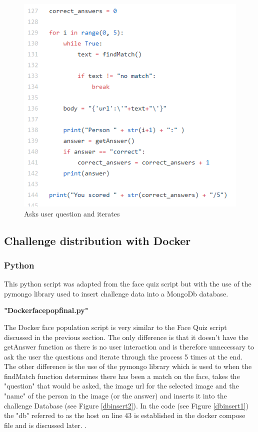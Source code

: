 \documentclass[12pt,a4paper]{article}
\begin{document}
\begin{figure}[!ht]
    \centering
    \includegraphics[width=1.0\textwidth]{Figs/askquestion.PNG} 
    \caption{Asks user question and iterates} 
    \label{askquestion}
\end{figure} 




\subsection{Challenge distribution with Docker} 
\subsubsection{Python}   
This python script was adapted from the face quiz script but with the use of the pymongo library used to insert challenge data into a MongoDb database. 

\textbf{"Docker\textunderscore face\textunderscore pop\textunderscore final.py"}   

The Docker face population script is very similar to the Face Quiz script discussed in the previous section. The only difference is that it doesn't have the getAnswer function as there is no user interaction and is therefore unnecessary to ask the user the questions and iterate through the process 5 times at the end. The other difference is the use of the pymongo library which is used to when the findMatch function determines there has been a match on the face, takes the "question" that would be asked, the image url for the selected image and the "name" of the person in the image (or the answer) and inserts it into the challenge Database (see Figure \ref{dbinsert2}). In the code (see Figure \ref{dbinsert1}) the "db" referred to as the host on line 43 is established in the docker compose file and is discussed later.  .
\end{document}
